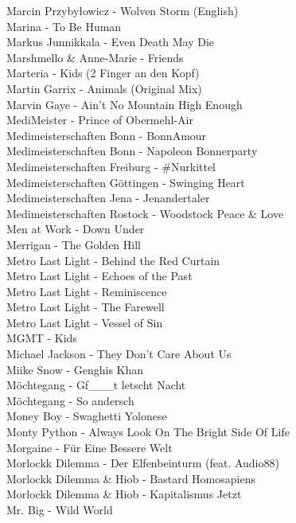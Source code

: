 Marcin Przybyłowicz - Wolven Storm (English)\\
Marina - To Be Human\\
Markus Junnikkala - Even Death May Die\\
Marshmello \& Anne-Marie - Friends\\
Marteria - Kids (2 Finger an den Kopf)\\
Martin Garrix - Animals (Original Mix)\\
Marvin Gaye - Ain't No Mountain High Enough\\
MediMeister - Prince of Obermehl-Air\\
Medimeisterschaften Bonn - BonnAmour\\
Medimeisterschaften Bonn - Napoleon Bonnerparty\\
Medimeisterschaften Freiburg - \#Nurkittel\\
Medimeisterschaften Göttingen - Swinging Heart\\
Medimeisterschaften Jena - Jenandertaler\\
Medimeisterschaften Rostock - Woodstock Peace \& Love\\
Men at Work - Down Under\\
Merrigan - The Golden Hill\\
Metro Last Light - Behind the Red Curtain\\
Metro Last Light - Echoes of the Past\\
Metro Last Light - Reminiscence\\
Metro Last Light - The Farewell\\
Metro Last Light - Vessel of Sin\\
MGMT - Kids\\
Michael Jackson - They Don't Care About Us\\
Miike Snow - Genghis Khan\\
Möchtegang - Gf\_\_\_t letscht Nacht\\
Möchtegang - So andersch\\
Money Boy - Swaghetti Yolonese\\
Monty Python - Always Look On The Bright Side Of Life\\
Morgaine - Für Eine Bessere Welt\\
Morlockk Dilemma - Der Elfenbeinturm (feat. Audio88)\\
Morlockk Dilemma \& Hiob - Bastard Homosapiens\\
Morlockk Dilemma \& Hiob - Kapitalismus Jetzt\\
Mr. Big - Wild World\\
